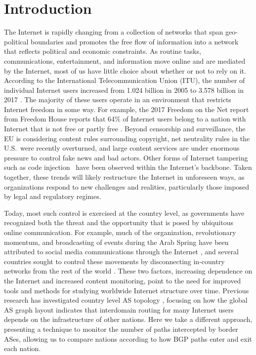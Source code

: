\section{Introduction}

\par The Internet is rapidly changing from a collection of networks that span geo-political boundaries and promotes the free flow of information into a network that reflects political and economic constraints.
As routine
tasks, communications, entertainment, and information move online and
are mediated by the Internet, most of us have little choice about
whether or not to rely on it.  According to the
International Telecommunication Union (ITU), the number of individual
Internet users increased from 1.024 billion in 2005 to 3.578 billion
in 2017 \cite{itu}. The majority of these users operate in an
environment that restricts Internet freedom in some way. For example,
the 2017 Freedom on the Net report from Freedom House reports that
64\% of Internet users belong to a nation with Internet that is not
free or partly free \cite{FOTN}.  Beyond censorship and surveillance,
the EU is considering content rules surrounding copyright, net
neutrality rules in the U.S.\ were recently overturned, and large
content services are under enormous pressure to control fake news and bad actors. Other forms of Internet
tampering such as code injection~\cite{badtraffic,191996} have been observed within the
Internet's backbone. Taken together, these
trends will likely restructure the Internet in unforeseen ways,
as organizations respond to new challenges and realities, particularly those imposed by legal and regulatory regimes.

Today, most such control is exercised at the country level, as
governments have recognized both the threat and the opportunity that
is posed by ubiquitous online communication. For example, much of the
organization, revolutionary momentum, and broadcasting of events
during the Arab Spring have been attributed to social media
communications through the Internet \cite{arabspring}, and several
countries sought to control these movements by disconnecting
in-country networks from the rest of the world \cite{BGPdisrupt}.
These two factors, increasing dependence on the Internet and increased
content monitoring, point to the need for improved tools and methods
for studying worldwide Internet structure over time. Previous research has
investigated country level AS topology \cite{DBLP:journals/corr/abs-0903-3218},
focusing on how the global AS graph layout indicates that interdomain routing
for many Internet users depends on the infrastructure of other nations. Here we take
a different approach, presenting a technique to monitor the number of paths intercepted
by border ASes, allowing us to compare nations according to how BGP paths enter and exit
each nation.

